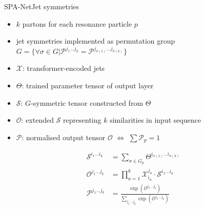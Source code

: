 \documentclass[9pt, aspectratio=169]{beamer}
\begin{document}
\begin{frame}{SPA-Net}{Jet symmetries}
	\begin{itemize}
		\item $k$ partons for each resonance particle $p$
		\item jet symmetries implemented as permutation group $G=\{\forall\sigma\in G | \mathcal{P}^{j_1...j_k} = \mathcal{P}^{j_{\sigma(1)}...j_{\sigma(k)}}\}$
		\item $\mathcal{X}$: transformer-encoded jets
		\item $\Theta$: trained parameter tensor of output layer
		\item $\mathcal{S}$: $G$-symmetric tensor constructed from $\Theta$
		\item $\mathcal{O}$: extended $\mathcal{S}$ representing $k$ similarities in input sequence
		\item $\mathcal{P}$: normalised output tensor $\mathcal{O}$ $\Leftrightarrow$ $\sum\mathcal{P}_p=1$
	\end{itemize}

	\begin{align*}
		\mathcal{S}^{i_1...i_k} &= \sum_{\sigma\in G_p} \Theta^{i_{\sigma(1)}...i_{\sigma(k)}}\\
		\mathcal{O}^{j_1...j_k} &= \prod_{a=1}^{k} \mathcal{X}_{i_a}^{j_a} \cdot \mathcal{S}^{i_1...i_k}\\
		\mathcal{P}^{j_1...j_k} &= \frac{\exp\left(\mathcal{O}^{j_1...j_k}\right)}{\sum_{j_1...j_k}\exp\left(\mathcal{O}^{j_1...j_k}\right)}
	\end{align*}
\end{frame}
\end{document}
